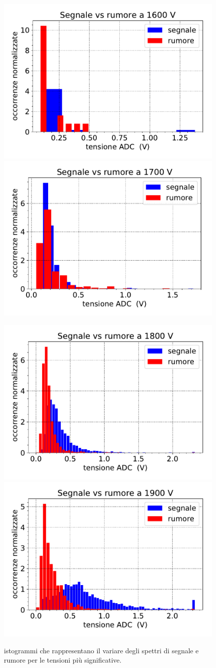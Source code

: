 \begin{figure}
	\hspace{-2cm}
	{\includegraphics[width=8 cm]{1600}}
	\qquad
	{\includegraphics[width=8 cm]{1700}} 

	\hspace{-2cm}
	{\includegraphics[width=8 cm]{1800}}
	\qquad
	{\includegraphics[width=8 cm]{1900}}
	\caption{istogrammi che rappresentano il variare degli spettri di segnale e rumore per le tensioni più significative.}
	\label{quattro}
\end{figure}

